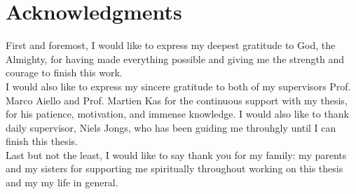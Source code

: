 
\begingroup
\let\clearpage\relax
\let\cleardoublepage\relax
\let\cleardoublepage\relax
\chapter*{Acknowledgments}
First and foremost, I would like to express my deepest gratitude to God, the Almighty, for having made everything possible and giving me the strength and courage to finish this work.\\

\noindent
I would also like to express my sincere gratitude to both of my supervisors Prof. Marco Aiello and Prof. Martien Kas for the continuous support with my thesis, for his patience, motivation, and immense knowledge. I would also like to thank daily supervisor, Niels Jongs, who has been guiding me throuhgly until I can finish this thesis.\\

\noindent
Last but not the least, I would like to say thank you for my family: my parents and my sisters for supporting me spiritually throughout working on this thesis and my my life in general.
\endgroup



